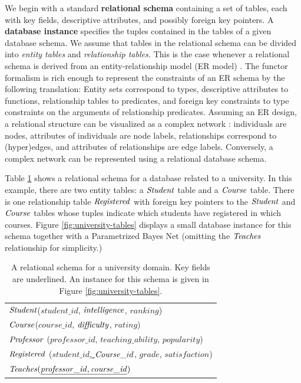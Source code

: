 \documentclass[runningheads,a4paper]{llncs}
\begin{document}
 We begin with a standard \textbf{relational schema} containing a set of tables, each with key fields, %
descriptive attributes, and possibly foreign key pointers. A \textbf{database instance} specifies the tuples contained in the tables of a given database schema. We assume that tables in the relational schema can be divided into {\em entity tables} and {\em relationship tables.} This is the case whenever a relational schema is derived from an entity-relationship model (ER model) \cite[Ch.2.2]{Ullman1982}. The functor formalism is rich enough to represent the constraints of an ER schema by the following translation: Entity sets correspond to types, descriptive attributes to functions, relationship tables to predicates, and foreign key constraints to type constraints on the arguments of relationship predicates.  Assuming an ER design, a relational structure can be visualized as a complex network \cite[Ch.8.2.1]{Russell2010}: individuals are nodes, attributes of individuals are node labels, relationships correspond to (hyper)edges, and attributes of relationships are edge labels. Conversely, a complex  network can be represented using a relational database schema.

Table \ref{table:university-schema} shows a relational schema for a database related to a university.
In this example, there are two entity tables: a $\mathit{Student}$ table and a $\mathit{Course}$ table.  There is one relationship table $\mathit{Registered}$ with foreign key pointers to the $\mathit{Student}$ and $\mathit{Course}$ tables whose tuples indicate which students have registered in which courses. 
 Figure \ref{fig:university-tables} displays a small database instance for this schema together with a Parametrized Bayes Net (omitting the $\it{Teaches}$ relationship for simplicity.) 
\begin{table}[tbp] \centering
\begin{tabular}
[c]{|l|}\hline
$\mathit{Student}$(\underline{$student\_id$}, $\mathit{intelligence}$, $ranking$)\\
$\mathit{Course}$(\underline{$course\_id$}, $\mathit{difficulty}$, $rating$)\\ 
$\mathit{Professor}$ (\underline{$professor\_id$}, $teaching\_ability$, $popularity$)\\
$\mathit{Registered}$ (\underline{$student\_id$, $\mathit{Course}\_id$}, $grade$, $satisfaction$)\\
$\it{Teaches}(\underline{\it{professor\_id, course\_id}})$
\\
\hline
\end{tabular}
\setlength{\abovecaptionskip}{10pt}
\caption{A relational schema for a university domain. Key fields are underlined. An instance for this schema is given in Figure \ref{fig:university-tables}.
\label{table:university-schema}} 
\end{table}
 
\end{document}
